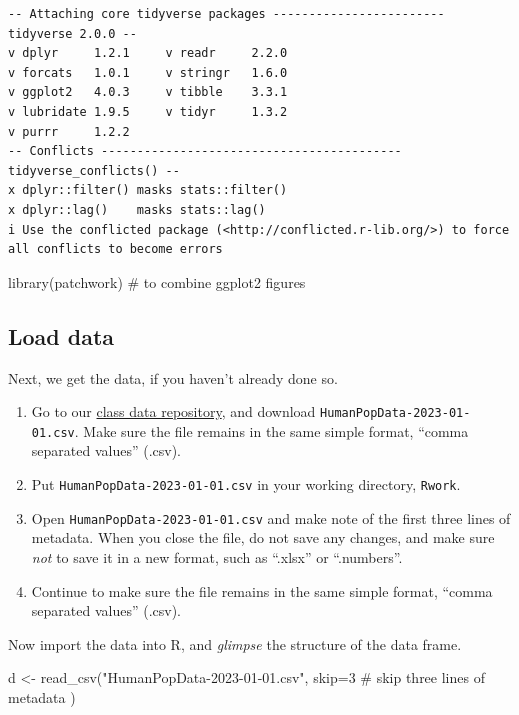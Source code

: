 \documentclass[
  letterpaper,
  DIV=11,
  numbers=noendperiod]{scrreprt}
\newenvironment{Shaded}{\begin{snugshade}}{\end{snugshade}}
\newcommand{\AttributeTok}[1]{\textcolor[rgb]{0.40,0.45,0.13}{#1}}
\newcommand{\CommentTok}[1]{\textcolor[rgb]{0.37,0.37,0.37}{#1}}
\newcommand{\DecValTok}[1]{\textcolor[rgb]{0.68,0.00,0.00}{#1}}
\newcommand{\FunctionTok}[1]{\textcolor[rgb]{0.28,0.35,0.67}{#1}}
\newcommand{\NormalTok}[1]{\textcolor[rgb]{0.00,0.23,0.31}{#1}}
\newcommand{\OtherTok}[1]{\textcolor[rgb]{0.00,0.23,0.31}{#1}}
\newcommand{\StringTok}[1]{\textcolor[rgb]{0.13,0.47,0.30}{#1}}
\providecommand{\tightlist}{%
  \setlength{\itemsep}{0pt}\setlength{\parskip}{0pt}}
\begin{document}
\begin{verbatim}
-- Attaching core tidyverse packages ------------------------ tidyverse 2.0.0 --
v dplyr     1.2.1     v readr     2.2.0
v forcats   1.0.1     v stringr   1.6.0
v ggplot2   4.0.3     v tibble    3.3.1
v lubridate 1.9.5     v tidyr     1.3.2
v purrr     1.2.2     
-- Conflicts ------------------------------------------ tidyverse_conflicts() --
x dplyr::filter() masks stats::filter()
x dplyr::lag()    masks stats::lag()
i Use the conflicted package (<http://conflicted.r-lib.org/>) to force all conflicts to become errors
\end{verbatim}

\begin{Shaded}
\begin{Highlighting}[]
\FunctionTok{library}\NormalTok{(patchwork) }\CommentTok{\# to combine ggplot2 figures}
\end{Highlighting}
\end{Shaded}

\subsection{Load data}\label{load-data}

Next, we get the data, if you haven't already done so.

\begin{enumerate}
\def\labelenumi{\arabic{enumi}.}
\tightlist
\item
  Go to our
  \href{https://drive.google.com/drive/u/1/folders/1FR2FLiW3xyD4Er52YzVTToPZuXXReGRo}{class
  data repository}, and download \texttt{HumanPopData-2023-01-01.csv}.
  Make sure the file remains in the same simple format, ``comma
  separated values'' (.csv).
\item
  Put \texttt{HumanPopData-2023-01-01.csv} in your working directory,
  \texttt{Rwork}.
\item
  Open \texttt{HumanPopData-2023-01-01.csv} and make note of the first
  three lines of metadata. When you close the file, do not save any
  changes, and make sure \emph{not} to save it in a new format, such as
  ``.xlsx'' or ``.numbers''.
\item
  Continue to make sure the file remains in the same simple format,
  ``comma separated values'' (.csv).
\end{enumerate}

Now import the data into R, and \emph{glimpse} the structure of the data
frame.

\begin{Shaded}
\begin{Highlighting}[]
\NormalTok{d }\OtherTok{\textless{}{-}} \FunctionTok{read\_csv}\NormalTok{(}\StringTok{"HumanPopData{-}2023{-}01{-}01.csv"}\NormalTok{, }
              \AttributeTok{skip=}\DecValTok{3} \CommentTok{\# skip three lines of metadata}
\NormalTok{              )}
\end{Highlighting}
\end{Shaded}
\end{document}
